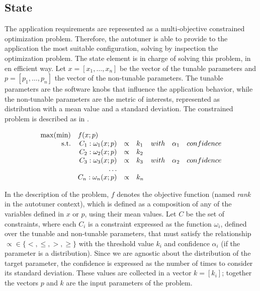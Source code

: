 \subsection{State}

The application requirements are represented as a multi-objective constrained optimization problem.
Therefore, the autotuner is able to provide to the application the most suitable configuration, solving by inspection the optimization problem.
The state element is in charge of solving this problem, in en efficient way.
Let $ x = [x_1, \ldots, x_n] $ be the vector of the tunable parameters and $ p = [p_1, \ldots, p_n] $ the vector of the non-tunable parameters.
The tunable parameters are the software knobs that influence the application behavior, while the non-tunable parameters are the metric of interests, represented as distribution with a mean value and a standard deviation.
The constrained problem is described as in .

\begin{equation}
\label{eq:optimization-general}
\begin{array}{rrclcl}
\displaystyle \max (\min) & \multicolumn{4}{l}{f(x;p)} \\
\textrm{s.t.} & C_1: \omega_1(x;p)  & \propto    & k_1  & with \quad \alpha_1 \quad confidence \\
&C_2: \omega_2(x;p)  & \propto   & k_2  &  \\
&C_3: \omega_3(x;p)  & \propto   & k_3  & with \quad \alpha_2 \quad confidence\\
& \ldots & & & \\
&C_n: \omega_n(x;p)  & \propto   & k_n
\end{array}
\end{equation}

In the description of the problem, $f$ denotes the objective function (named \textit{rank} in the autotuner context), which is defined as a composition of any of the variables defined in $x$ or $p$, using their mean values.
Let $C$ be the set of constraints, where each $C_i$ is a constraint expressed as the function $\omega_i$, defined over the tunable and non-tunable parameters, that must satisfy the relationship $ \propto  \in \{<,\leq ,> ,\geq \} $ with the threshold value $k_i$ and confidence $\alpha_i$ (if the parameter is a distribution).
Since we are agnostic about the distribution of the target parameter, the confidence is expressed as the number of times to consider its standard deviation.
These values are collected in a vector $ k= [ k_i ] $; together the vectors $p$ and $k$ are the input parameters of the problem.

